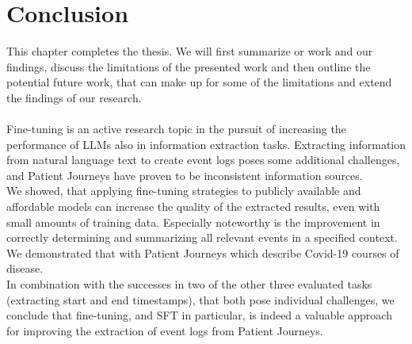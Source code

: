 \section{Conclusion}\label{sec:conclusion}
This chapter completes the thesis. We will first summarize or work and our findings, discuss the limitations of the presented work and then outline the potential future work, that can make up for some of the limitations and extend the findings of our research.\\\\
Fine-tuning is an active research topic in the pursuit of increasing the performance of LLMs also in information extraction tasks. Extracting information from natural language text to create event logs poses some additional challenges, and Patient Journeys have proven to be inconsistent information sources.\\
We showed, that applying fine-tuning strategies to publicly available and affordable models can increase the quality of the extracted results, even with small amounts of training data. Especially noteworthy is the improvement in correctly determining and summarizing all relevant events in a specified context. We demonstrated that with Patient Journeys which describe Covid-19 courses of disease.\\
In combination with the successes in two of the other three evaluated tasks (extracting start and end timestamps), that both pose individual challenges, we conclude that fine-tuning, and SFT in particular, is indeed a valuable approach for improving the extraction of event logs from Patient Journeys.

